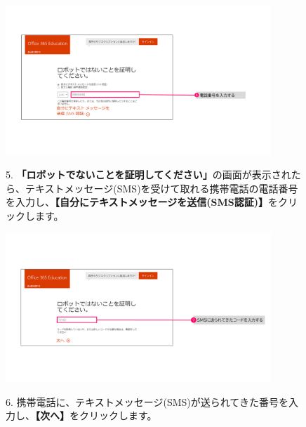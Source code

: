 \begin{figure}[h]
    \begin{minipage}{0.6\textwidth}
        \includegraphics[width=10cm]{figures/O365A1_submission04.png}
    \end{minipage}
    \begin{minipage}{0.4\textwidth}
       5. \textbf{「ロボットでないことを証明してください」}の画面が表示されたら、テキストメッセージ(SMS)を受けて取れる携帯電話の電話番号を入力し、\textbf{【自分にテキストメッセージを送信(SMS認証)】}をクリックします。
    \end{minipage}
\end{figure}

\begin{figure}[h]
    \begin{minipage}{0.6\textwidth}
        \includegraphics[width=10cm]{figures/O365A1_submission05.png}
    \end{minipage}
    \begin{minipage}{0.4\textwidth}
       6. 携帯電話に、テキストメッセージ(SMS)が送られてきた番号を入力し、\textbf{【次へ】}をクリックします。
    \end{minipage}
\end{figure}

